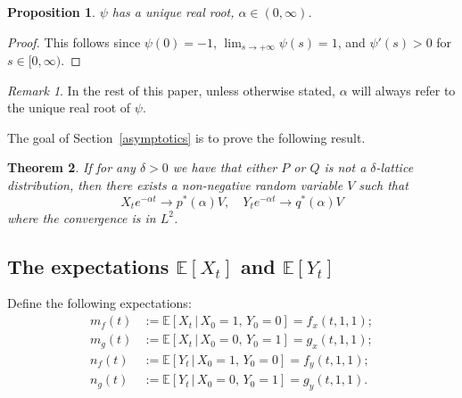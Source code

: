 \documentclass[12pt]{amsart}
\theoremstyle{plain}
\newtheorem{thm}{Theorem}[section]
\newtheorem{prop}[thm]{Proposition}
\theoremstyle{definition}
\theoremstyle{remark}
\newtheorem*{rem}{Remark}
\theoremstyle{definition}
\begin{document}
\begin{prop}\label{multiPsiRoot}
$\psi$ has a unique real root, $\alpha \in (0,\infty)$.
\end{prop}

\begin{proof}
This follows since $\psi(0) = -1$, $\lim_{s \to +\infty} \psi(s) = 1$, and $\psi'(s) > 0$ for $s \in [0,\infty)$.
\end{proof}

\begin{rem}
In the rest of this paper, unless otherwise stated, $\alpha$ will always refer to the unique real root of $\psi$.
\end{rem}

The goal of Section~\ref{asymptotics} is to prove the following result.

\begin{thm} \label{main-asymp}
If for any $\delta>0$ we have that either $P$ or $Q$ is not a $\delta$-lattice distribution, then there exists a non-negative random variable $V$ such that
\begin{equation}
X_t e^{-\alpha t} \to p^*(\alpha) V , \quad
Y_t e^{-\alpha t} \to q^*(\alpha) V
\end{equation}
where the convergence is in $L^2$.
\end{thm}

\subsection{The expectations $\mathbb{E}[X_t]$ and $\mathbb{E}[Y_t]$}

Define the following expectations:
\begin{equation}
\begin{aligned} 
m_f(t) &:= \mathbb{E}\left[X_t \, | \, X_0 = 1, \, Y_0=0\right] = f_x(t,1,1); \\
m_g(t) &:= \mathbb{E}\left[X_t \, | \, X_0 = 0, \, Y_0=1\right] = g_x(t,1,1); \\
n_f(t) &:= \mathbb{E}\left[Y_t \, | \, X_0 = 1, \, Y_0=0\right] = f_y(t,1,1); \\
n_g(t) &:= \mathbb{E}\left[Y_t \, | \, X_0=0, \, Y_0=1\right] = g_y(t,1,1).
\end{aligned}
\end{equation}
\end{document}
